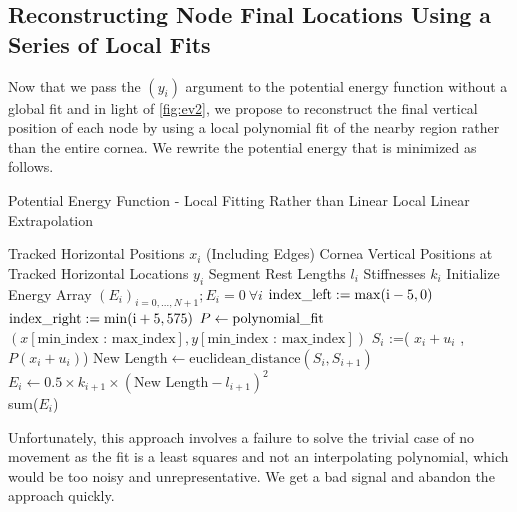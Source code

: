 \documentclass[epjST]{svjour}
\begin{document}
\subsection{Reconstructing Node Final Locations Using a Series of Local Fits}
Now that we pass the $(y_i)$ argument to the potential energy function without a global fit and in light of \autoref{fig:ev2}, we propose to reconstruct the final vertical position of each node by using a local polynomial fit of the nearby region rather than the entire cornea. We rewrite the potential energy that is minimized as follows.
\begin{algorithm}
    \caption{Potential Energy Function - Local Fitting Rather than Linear Local Linear Extrapolation}
    \label{locfit}
   \begin{algorithmic}[1]
        \Require Tracked Horizontal Positions $x_i$ (Including Edges)
        \Require Cornea Vertical Positions at Tracked Horizontal Locations $y_i$
        \Require Segment Rest Lengths $l_i$
        \Require Stiffnesses $k_i$
        \State Initialize Energy Array $(E_i)_{i=0,...,N+1}; E_i = 0\:\forall i$
        \State $\rm index\_left := \max(i-5,0)$
        \State $\rm index\_right := \min(i+5, 575)$
        \State $P\gets \rm polynomial\_fit$ $(x[\text{min\_index : max\_index}], y[\text{min\_index : max\_index}])$
        \State $S_i$ :=( $x_i+u_i$ , $P(x_i+u_i)$)
        \EndFor
        \State $\text{New Length}\gets \text{euclidean\_distance}(S_i,S_{i+1} )$
        \State $E_i\gets 0.5\times k_{i+1} \times (\text{New Length} - l_{i+1})^2$
        \EndFor\\
        \Return sum($E_i$)
    \end{algorithmic}
\end{algorithm}
Unfortunately, this approach involves a failure to solve the trivial case of no movement as the fit is a least squares and not an interpolating polynomial, which would be too noisy and unrepresentative. We get a bad signal and abandon the approach quickly.
\end{document}
